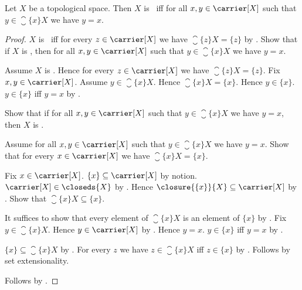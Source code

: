 \begin{theorem}\label{teeone_iff_singleton_closure_points}
    Let $X$ be a topological space.
    Then $X$ is \teeone\ iff for all $x,y\in\carrier[X]$ such that
        $y\in\closure{\{x\}}{X}$ we have $y=x$.
\end{theorem}
\begin{proof}
    $X$ is \teeone\ iff for every $z\in\carrier[X]$ we have
        $\closure{\{z\}}{X}=\{z\}$ by
        .
    Show that if $X$ is \teeone, then for all $x,y\in\carrier[X]$ such
        that $y\in\closure{\{x\}}{X}$ we have $y=x$.
    \begin{subproof}
        Assume $X$ is \teeone.
        Hence for every $z\in\carrier[X]$ we have
            $\closure{\{z\}}{X}=\{z\}$.
        Fix $x,y\in\carrier[X]$.
        Assume $y\in\closure{\{x\}}{X}$.
        Hence $\closure{\{x\}}{X}=\{x\}$.
        Hence $y\in\{x\}$.
        $y\in\{x\}$ iff $y=x$ by .
    \end{subproof}

    Show that if for all $x,y\in\carrier[X]$ such that
        $y\in\closure{\{x\}}{X}$ we have $y=x$, then
        $X$ is \teeone.
    \begin{subproof}
        Assume for all $x,y\in\carrier[X]$ such that
            $y\in\closure{\{x\}}{X}$ we have $y=x$.
        Show that for every $x\in\carrier[X]$ we have
            $\closure{\{x\}}{X}=\{x\}$.
        \begin{subproof}
            Fix $x\in\carrier[X]$.
            $\{x\}\subseteq\carrier[X]$ by notion.
            $\carrier[X]\in\closeds{X}$ by
                .
            Hence $\closure{\{x\}}{X}\subseteq\carrier[X]$ by
                .
            Show that $\closure{\{x\}}{X}\subseteq\{x\}$.
            \begin{subproof}
                It suffices to show that every element of
                    $\closure{\{x\}}{X}$ is an element of $\{x\}$ by
                    .
                Fix $y\in\closure{\{x\}}{X}$.
                Hence $y\in\carrier[X]$ by .
                Hence $y=x$.
                $y\in\{x\}$ iff $y=x$ by .
            \end{subproof}
            $\{x\}\subseteq\closure{\{x\}}{X}$ by
                .
            For every $z$ we have $z\in\closure{\{x\}}{X}$ iff
                $z\in\{x\}$ by .
            Follows by set extensionality.
        \end{subproof}
    \end{subproof}
    Follows by \auto.
\end{proof}
